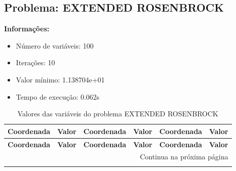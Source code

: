\documentclass[12pt]{article}
\begin{document}
\newpage            
\subsection{Problema: EXTENDED ROSENBROCK}

\textbf{Informações:}
\begin{itemize}
\item Número de variáveis: 100
\item Iterações: 10
\item Valor mínimo: 1.138704e+01
\item Tempo de execução: 0.062s
\end{itemize}

\small
\begin{longtable}{@{}cc|cc|cc@{}}
\caption{Valores das variáveis do problema EXTENDED ROSENBROCK} \\
\toprule
\textbf{Coordenada} & \textbf{Valor} & \textbf{Coordenada} & \textbf{Valor} & \textbf{Coordenada} & \textbf{Valor} \\
\midrule
\endfirsthead

\toprule
\textbf{Coordenada} & \textbf{Valor} & \textbf{Coordenada} & \textbf{Valor} & \textbf{Coordenada} & \textbf{Valor} \\
\midrule
\endhead

\midrule \multicolumn{6}{r}{{Continua na próxima página}} \\ \midrule
\endfoot


\end{longtable}
\end{document}
